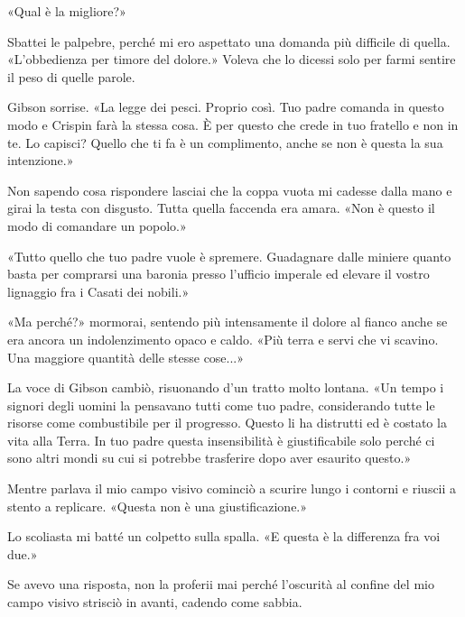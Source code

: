 «Qual è la migliore?»

Sbattei le palpebre, perché mi ero aspettato una domanda più difficile
di quella. «L'obbedienza per timore del dolore.» Voleva che lo dicessi
solo per farmi sentire il peso di quelle parole.

Gibson sorrise. «La legge dei pesci. Proprio così. Tuo padre comanda in
questo modo e Crispin farà la stessa cosa. È per questo che crede in tuo
fratello e non in te. Lo capisci? Quello che ti fa è un complimento,
anche se non è questa la sua intenzione.»

Non sapendo cosa rispondere lasciai che la coppa vuota mi cadesse dalla
mano e girai la testa con disgusto. Tutta quella faccenda era amara.
«Non è questo il modo di comandare un popolo.»

«Tutto quello che tuo padre vuole è spremere. Guadagnare dalle miniere
quanto basta per comprarsi una baronia presso l'ufficio imperale ed
elevare il vostro lignaggio fra i Casati dei nobili.»

«Ma perché?» mormorai, sentendo più intensamente il dolore al fianco
anche se era ancora un indolenzimento opaco e caldo. «Più terra e servi
che vi scavino. Una maggiore quantità delle stesse cose...»

La voce di Gibson cambiò, risuonando d'un tratto molto lontana. «Un
tempo i signori degli uomini la pensavano tutti come tuo padre,
considerando tutte le risorse come combustibile per il progresso. Questo
li ha distrutti ed è costato la vita alla Terra. In tuo padre questa
insensibilità è giustificabile solo perché ci sono altri mondi su cui si
potrebbe trasferire dopo aver esaurito questo.»

Mentre parlava il mio campo visivo cominciò a scurire lungo i contorni e
riuscii a stento a replicare. «Questa non è una giustificazione.»

Lo scoliasta mi batté un colpetto sulla spalla. «E questa è la
differenza fra voi due.»

Se avevo una risposta, non la proferii mai perché l'oscurità al confine
del mio campo visivo strisciò in avanti, cadendo come sabbia.

\begin{figure}
	\centering
	\def\svgwidth{\columnwidth}
	\scalebox{0.2}{}
\end{figure}

